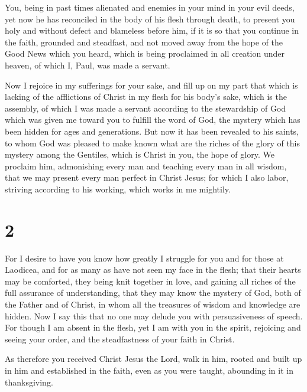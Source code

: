  You, being in past times alienated and enemies in your
mind in your evil deeds,  yet now he has reconciled in
the body of his flesh through death, to present you holy and without
defect and blameless before him,  if it is so that you
continue in the faith, grounded and steadfast, and not moved away from
the hope of the Good News which you heard, which is being proclaimed in
all creation under heaven, of which I, Paul, was made a servant.

 Now I rejoice in my sufferings for your sake, and fill
up on my part that which is lacking of the afflictions of Christ in my
flesh for his body's sake, which is the assembly,  of
which I was made a servant according to the stewardship of God which was
given me toward you to fulfill the word of God,  the
mystery which has been hidden for ages and generations. But now it has
been revealed to his saints,  to whom God was pleased to
make known what are the riches of the glory of this mystery among the
Gentiles, which is Christ in you, the hope of glory.  We
proclaim him, admonishing every man and teaching every man in all
wisdom, that we may present every man perfect in Christ Jesus;
 for which I also labor, striving according to his
working, which works in me mightily.

\hypertarget{section-1}{%
\section{2}\label{section-1}}

 For I desire to have you know how greatly I struggle for
you and for those at Laodicea, and for as many as have not seen my face
in the flesh;  that their hearts may be comforted, they
being knit together in love, and gaining all riches of the full
assurance of understanding, that they may know the mystery of God, both
of the Father and of Christ,  in whom all the treasures of
wisdom and knowledge are hidden.  Now I say this that no
one may delude you with persuasiveness of speech.  For
though I am absent in the flesh, yet I am with you in the spirit,
rejoicing and seeing your order, and the steadfastness of your faith in
Christ.

 As therefore you received Christ Jesus the Lord, walk in
him,  rooted and built up in him and established in the
faith, even as you were taught, abounding in it in thanksgiving.

